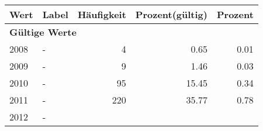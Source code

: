      \begin{longtable}{lXrrr}
     \toprule
     \textbf{Wert} & \textbf{Label} & \textbf{Häufigkeit} & \textbf{Prozent(gültig)} & \textbf{Prozent} \\
     \endhead
     \midrule
     \multicolumn{5}{l}{\textbf{Gültige Werte}}\\

     2008 &
     \multicolumn{1}{X}{ -  } &


       \num{4} &
       \num[round-mode=places,round-precision=2]{0.65} &
         \num[round-mode=places,round-precision=2]{0.01} \\

     2009 &
     \multicolumn{1}{X}{ -  } &


       \num{9} &
       \num[round-mode=places,round-precision=2]{1.46} &
         \num[round-mode=places,round-precision=2]{0.03} \\

     2010 &
     \multicolumn{1}{X}{ -  } &


       \num{95} &
       \num[round-mode=places,round-precision=2]{15.45} &
         \num[round-mode=places,round-precision=2]{0.34} \\

     2011 &
     \multicolumn{1}{X}{ -  } &


       \num{220} &
       \num[round-mode=places,round-precision=2]{35.77} &
         \num[round-mode=places,round-precision=2]{0.78} \\

     2012 &
     \multicolumn{1}{X}{ -  } &



\end{longtable}
